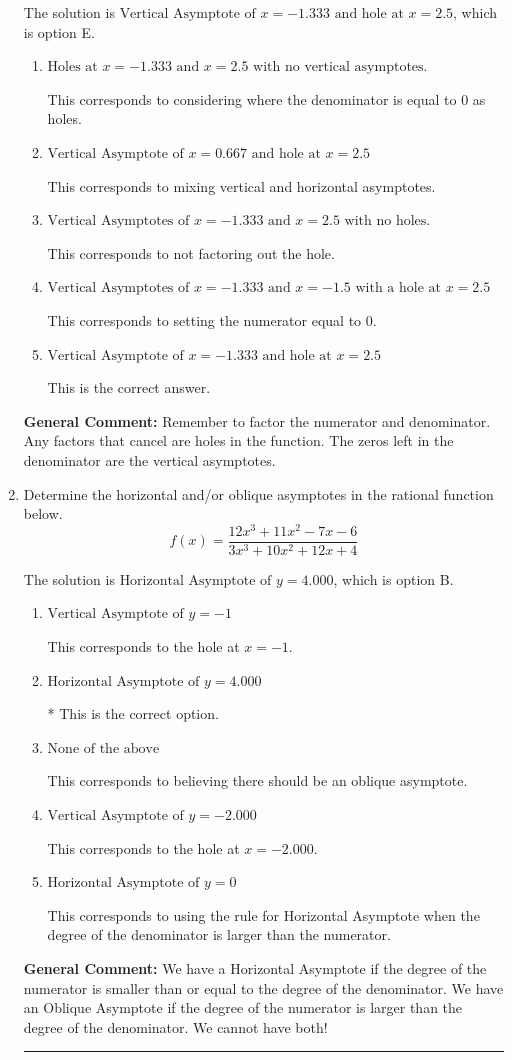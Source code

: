\documentclass{extbook}[14pt]
\newcommand{\litem}[1]{\item #1

\rule{\textwidth}{0.4pt}}
\begin{document}
\begin{enumerate}
{The solution is \( \text{Vertical Asymptote of } x = -1.333 \text{ and hole at } x = 2.5 \), which is option E.\begin{enumerate}[label=\Alph*.]
\item \( \text{Holes at } x = -1.333 \text{ and } x = 2.5 \text{ with no vertical asymptotes.} \)

This corresponds to considering where the denominator is equal to 0 as holes.
\item \( \text{Vertical Asymptote of } x = 0.667 \text{ and hole at } x = 2.5 \)

This corresponds to mixing vertical and horizontal asymptotes.
\item \( \text{Vertical Asymptotes of } x = -1.333 \text{ and } x = 2.5 \text{ with no holes.} \)

This corresponds to not factoring out the hole.
\item \( \text{Vertical Asymptotes of } x = -1.333 \text{ and } x = -1.5 \text{ with a hole at } x = 2.5 \)

This corresponds to setting the numerator equal to 0.
\item \( \text{Vertical Asymptote of } x = -1.333 \text{ and hole at } x = 2.5 \)

This is the correct answer.
\end{enumerate}

\textbf{General Comment:} Remember to factor the numerator and denominator. Any factors that cancel are holes in the function. The zeros left in the denominator are the vertical asymptotes.
}
\litem{
Determine the horizontal and/or oblique asymptotes in the rational function below.
\[ f(x) = \frac{12x^{3} +11 x^{2} -7 x -6}{3x^{3} +10 x^{2} +12 x + 4} \]

The solution is \( \text{Horizontal Asymptote of } y = 4.000  \), which is option B.\begin{enumerate}[label=\Alph*.]
\item \( \text{Vertical Asymptote of } y = -1  \)

This corresponds to the hole at $x = -1$.
\item \( \text{Horizontal Asymptote of } y = 4.000  \)

* This is the correct option.
\item \( \text{None of the above} \)

This corresponds to believing there should be an oblique asymptote.
\item \( \text{Vertical Asymptote of } y = -2.000  \)

This corresponds to the hole at $x = -2.000$.
\item \( \text{Horizontal Asymptote of } y = 0  \)

This corresponds to using the rule for Horizontal Asymptote when the degree of the denominator is larger than the numerator.
\end{enumerate}

\textbf{General Comment:} We have a Horizontal Asymptote if the degree of the numerator is smaller than or equal to the degree of the denominator. We have an Oblique Asymptote if the degree of the numerator is larger than the degree of the denominator. We cannot have both!
}
\end{enumerate}
\end{document}
